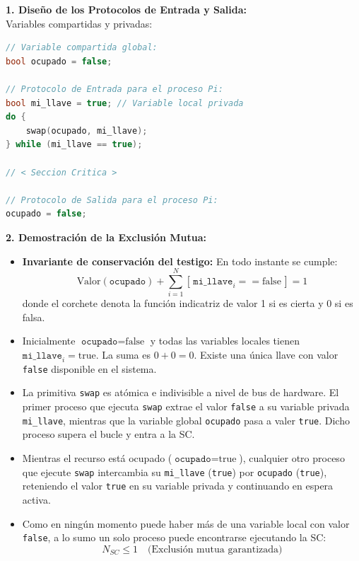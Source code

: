 \documentclass[11pt,a4paper,twoside,openright]{report}
\begin{document}
\begin{solucion}
\textbf{1. Diseño de los Protocolos de Entrada y Salida:}\\
Variables compartidas y privadas:
\begin{lstlisting}[language=C++]
// Variable compartida global:
bool ocupado = false;

// Protocolo de Entrada para el proceso Pi:
bool mi_llave = true; // Variable local privada
do {
    swap(ocupado, mi_llave);
} while (mi_llave == true);

// < Seccion Critica >

// Protocolo de Salida para el proceso Pi:
ocupado = false;
\end{lstlisting}

\textbf{2. Demostración de la Exclusión Mutua:}\\
\begin{itemize}[leftmargin=*]
    \item \textbf{Invariante de conservación del testigo:} En todo instante se cumple:
    \[
    \text{Valor}(\texttt{ocupado}) + \sum_{i=1}^N [\,\texttt{mi\_llave}_i == \text{false}\,] = 1
    \]
    donde el corchete denota la función indicatriz de valor 1 si es cierta y 0 si es falsa.
    \item Inicialmente $\texttt{ocupado} = \text{false}$ y todas las variables locales tienen $\texttt{mi\_llave}_i = \text{true}$. La suma es $0 + 0 = 0$. Existe una única llave con valor \texttt{false} disponible en el sistema.
    \item La primitiva \texttt{swap} es atómica e indivisible a nivel de bus de hardware. El primer proceso que ejecuta \texttt{swap} extrae el valor \texttt{false} a su variable privada \texttt{mi\_llave}, mientras que la variable global \texttt{ocupado} pasa a valer \texttt{true}. Dicho proceso supera el bucle y entra a la SC.
    \item Mientras el recurso está ocupado ($\texttt{ocupado} = \text{true}$), cualquier otro proceso que ejecute \texttt{swap} intercambia su \texttt{mi\_llave} (\texttt{true}) por \texttt{ocupado} (\texttt{true}), reteniendo el valor \texttt{true} en su variable privada y continuando en espera activa.
    \item Como en ningún momento puede haber más de una variable local con valor \texttt{false}, a lo sumo un solo proceso puede encontrarse ejecutando la SC:
    \[
    N_{SC} \le 1 \quad \text{(Exclusión mutua garantizada)}
    \]
\end{itemize}


\end{solucion}
\end{document}
